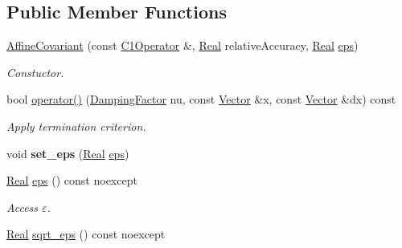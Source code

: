 \subsection*{Public Member Functions}
\begin{DoxyCompactItemize}
\item 
\hypertarget{classSpacy_1_1Newton_1_1Termination_1_1AffineCovariant_ab3977d3ebf7737d8f44b1b6beb949eaf}{\hyperlink{classSpacy_1_1Newton_1_1Termination_1_1AffineCovariant_ab3977d3ebf7737d8f44b1b6beb949eaf}{Affine\-Covariant} (const \hyperlink{classSpacy_1_1C1Operator}{C1\-Operator} \&, \hyperlink{classSpacy_1_1Real}{Real} relative\-Accuracy, \hyperlink{classSpacy_1_1Real}{Real} \hyperlink{classSpacy_1_1Mixin_1_1Eps_a812b99b0abc1d78a34b4114907f23f52}{eps})}\label{classSpacy_1_1Newton_1_1Termination_1_1AffineCovariant_ab3977d3ebf7737d8f44b1b6beb949eaf}

\begin{DoxyCompactList}\small\item\em Constuctor. \end{DoxyCompactList}\item 
bool \hyperlink{classSpacy_1_1Newton_1_1Termination_1_1AffineCovariant_aa33460372120d1ddcd3daf7c79140dcf}{operator()} (\hyperlink{classSpacy_1_1DampingFactor}{Damping\-Factor} nu, const \hyperlink{classSpacy_1_1Vector}{Vector} \&x, const \hyperlink{classSpacy_1_1Vector}{Vector} \&dx) const 
\begin{DoxyCompactList}\small\item\em Apply termination criterion. \end{DoxyCompactList}\item 
\hypertarget{classSpacy_1_1Mixin_1_1Eps_a818ab6dfab5e4eea583e1302bcc621f8}{void {\bfseries set\-\_\-eps} (\hyperlink{classSpacy_1_1Real}{Real} \hyperlink{classSpacy_1_1Mixin_1_1Eps_a812b99b0abc1d78a34b4114907f23f52}{eps})}\label{classSpacy_1_1Mixin_1_1Eps_a818ab6dfab5e4eea583e1302bcc621f8}

\item 
\hypertarget{classSpacy_1_1Mixin_1_1Eps_a812b99b0abc1d78a34b4114907f23f52}{\hyperlink{classSpacy_1_1Real}{Real} \hyperlink{classSpacy_1_1Mixin_1_1Eps_a812b99b0abc1d78a34b4114907f23f52}{eps} () const noexcept}\label{classSpacy_1_1Mixin_1_1Eps_a812b99b0abc1d78a34b4114907f23f52}

\begin{DoxyCompactList}\small\item\em Access $\varepsilon$. \end{DoxyCompactList}\item 
\hypertarget{classSpacy_1_1Mixin_1_1Eps_a1c1b0ed7f14ed4967dc7da9295a136d4}{\hyperlink{classSpacy_1_1Real}{Real} \hyperlink{classSpacy_1_1Mixin_1_1Eps_a1c1b0ed7f14ed4967dc7da9295a136d4}{sqrt\-\_\-eps} () const noexcept}\label{classSpacy_1_1Mixin_1_1Eps_a1c1b0ed7f14ed4967dc7da9295a136d4}


\end{DoxyCompactItemize}
